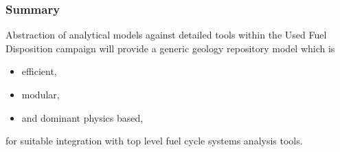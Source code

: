 

\begin{frame}[ctb!]
  \frametitle{Summary}
  Abstraction of analytical models against detailed tools within the Used Fuel 
  Disposition campaign will  provide a generic geology repository model which is  
  \begin{itemize}
    \item efficient,
    \item modular,
    \item and dominant physics based,
  \end{itemize}
  for suitable integration with top level fuel cycle systems analysis tools.
\end{frame}

